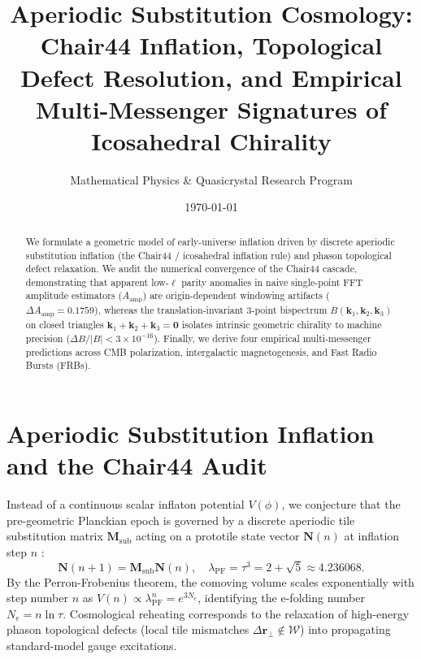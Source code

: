 \documentclass[aps,prd,twocolumn,superscriptaddress,nofootinbib]{revtex4-2}
\begin{document}
\title{Aperiodic Substitution Cosmology: Chair44 Inflation, Topological Defect Resolution, and Empirical Multi-Messenger Signatures of Icosahedral Chirality}

\author{Mathematical Physics \& Quasicrystal Research Program}
\date{\today}

\begin{abstract}
We formulate a geometric model of early-universe inflation driven by discrete aperiodic substitution inflation (the Chair44 / icosahedral inflation rule) and phason topological defect relaxation. We audit the numerical convergence of the Chair44 cascade, demonstrating that apparent low-$\ell$ parity anomalies in naive single-point FFT amplitude estimators ($A_{\mathrm{amp}}$) are origin-dependent windowing artifacts ($\Delta A_{\mathrm{amp}} = 0.1759$), whereas the translation-invariant 3-point bispectrum $B(\bm{k}_1,\bm{k}_2,\bm{k}_3)$ on closed triangles $\bm{k}_1+\bm{k}_2+\bm{k}_3=\bm{0}$ isolates intrinsic geometric chirality to machine precision ($\Delta B/|B| < 3\times 10^{-16}$). Finally, we derive four empirical multi-messenger predictions across CMB polarization, intergalactic magnetogenesis, and Fast Radio Bursts (FRBs).
\end{abstract}

\maketitle

\section{Aperiodic Substitution Inflation and the Chair44 Audit}
Instead of a continuous scalar inflaton potential $V(\phi)$, we conjecture that the pre-geometric Planckian epoch is governed by a discrete aperiodic tile substitution matrix $\mathbf{M}_{\mathrm{sub}}$ acting on a prototile state vector $\bm{N}(n)$ at inflation step $n$ \cite{Penrose1974,Smith2024}:
\begin{equation}
\bm{N}(n+1) = \mathbf{M}_{\mathrm{sub}} \bm{N}(n), \quad \lambda_{\mathrm{PF}} = \tau^3 = 2 + \sqrt{5} \approx 4.236068.
\end{equation}
By the Perron-Frobenius theorem, the comoving volume scales exponentially with step number $n$ as $V(n) \propto \lambda_{\mathrm{PF}}^n = e^{3 N_e}$, identifying the e-folding number $N_e = n \ln \tau$. Cosmological reheating corresponds to the relaxation of high-energy phason topological defects (local tile mismatches $\Delta\bm{r}_\perp \notin \mathcal{W}$) into propagating standard-model gauge excitations.
\end{document}

